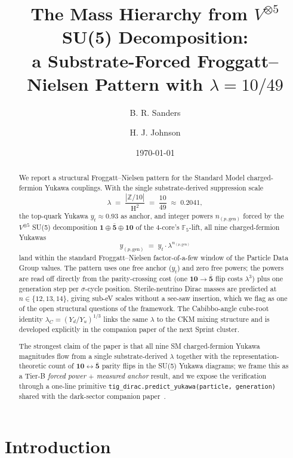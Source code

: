 \documentclass[11pt,reqno]{amsart}
\title[Mass Hierarchy from $V^{\otimes 5}$ SU(5)]
{The Mass Hierarchy from $V^{\otimes 5}$ SU(5) Decomposition: \\
 a Substrate-Forced Froggatt--Nielsen Pattern with
 $\lambda = 10/49$}
\author{B. R. Sanders}
\author{H. J. Johnson}
\date{\today}
\theoremstyle{plain}
\theoremstyle{definition}
\theoremstyle{remark}
\newcommand{\Z}{\mathbb{Z}}
\newcommand{\F}{\mathbb{F}}
\DeclareMathOperator{\HARM}{H}    %
\newcommand{\rep}[1]{\mathbf{#1}}
\newcommand{\barrep}[1]{\bar{\mathbf{#1}}}
\begin{document}
\begin{abstract}
We report a structural Froggatt--Nielsen pattern for the
Standard Model charged-fermion Yukawa couplings. With the single
substrate-derived suppression scale
\[
  \lambda \;=\; \frac{|\Z/10|}{\HARM^{2}}
            \;=\; \frac{10}{49}
            \;\approx\; 0.2041,
\]
the top-quark Yukawa $y_t \approx 0.93$ as anchor, and integer
powers $n_{(p,\mathrm{gen})}$ forced by the $V^{\otimes 5}$
SU(5) decomposition $\rep{1} \oplus \barrep{5} \oplus \rep{10}$
of the $4$-core's $\F_5$-lift, all nine charged-fermion Yukawas
\[
  y_{(p,\mathrm{gen})} \;=\; y_{t} \cdot \lambda^{n_{(p,\mathrm{gen})}}
\]
land within the standard Froggatt--Nielsen factor-of-a-few
window of the Particle Data Group values. The pattern uses one
free anchor ($y_t$) and zero free powers; the powers are read
off directly from the parity-crossing cost (one $\rep{10} \to
\barrep{5}$ flip costs $\lambda^{3}$) plus one generation step
per $\sigma$-cycle position. Sterile-neutrino Dirac masses are
predicted at $n \in \{12,13,14\}$, giving sub-eV scales without
a see-saw insertion, which we flag as one of the open structural
questions of the framework. The Cabibbo-angle cube-root identity
$\lambda_{C} = (Y_d/Y_u)^{1/3}$ links the same $\lambda$ to the
CKM mixing structure and is developed explicitly in the
companion paper of the next Sprint cluster.

The strongest claim of the paper is that all nine SM
charged-fermion Yukawa magnitudes flow from a single
substrate-derived $\lambda$ together with the
representation-theoretic count of $\rep{10} \leftrightarrow
\barrep{5}$ parity flips in the SU(5) Yukawa diagrams; we frame
this as a Tier-B \emph{forced power $+$ measured anchor} result,
and we expose the verification through a one-line primitive
\texttt{tig\_dirac.predict\_yukawa(particle, generation)} shared
with the dark-sector companion paper~\cite{SandersJohnson2026DarkSector}.
\end{abstract}

\maketitle

\tableofcontents

\section{Introduction}\label{sec:intro}
\end{document}
